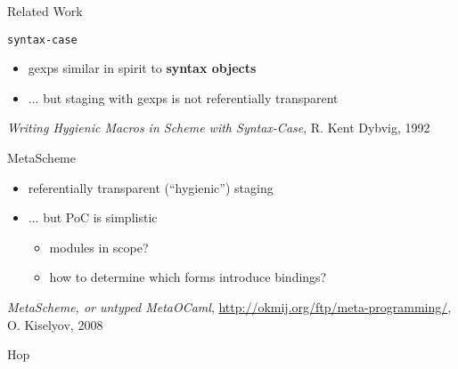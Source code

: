\documentclass{beamer}
\newcommand{\highlight}[1]{\alert{\textbf{#1}}}
\begin{document}
\begin{frame}[fragile]
  \Huge{Related Work}
\end{frame}

\begin{frame}[fragile]{\texttt{syntax-case}}
  \begin{itemize}
  \item gexps similar in spirit to \highlight{syntax objects}
  \item ... but staging with gexps is not referentially transparent
  \end{itemize}

  \vfill{}
  \small{
    \textit{Writing Hygienic Macros in Scheme with Syntax-Case}, R. Kent
    Dybvig, 1992
  }
\end{frame}

\begin{frame}[fragile]{MetaScheme}

  \begin{itemize}
  \item referentially transparent (``hygienic'') staging
  \item {... but PoC is simplistic
    \begin{itemize}
    \item modules in scope?
    \item how to determine which forms introduce bindings?
    \end{itemize}}
  \end{itemize}

  \vfill{}
  \small{
    \textit{MetaScheme, or untyped MetaOCaml},
    \url{http://okmij.org/ftp/meta-programming/}, O. Kiselyov, 2008
  }
\end{frame}

\begin{frame}[fragile]{Hop}

\end{frame}
\end{document}
